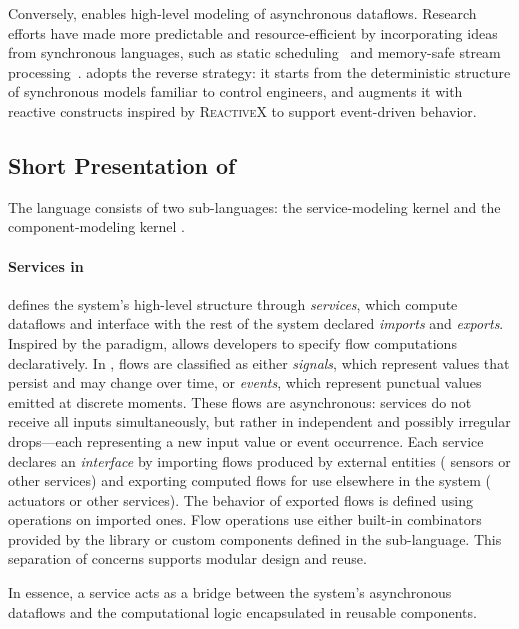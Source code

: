 Conversely, \frp enables high-level modeling of asynchronous dataflows. Research efforts have made
\frp more predictable and resource-efficient by incorporating ideas from synchronous languages,
such as static scheduling~\cite{DBLP:conf/haskell/NilssonCP02,DBLP:conf/ppdp/ChupinN19} and
memory-safe stream processing~\cite{DBLP:conf/icfp/Krishnaswami13}. \GRust adopts the reverse
strategy: it starts from the deterministic structure of synchronous models familiar to control
engineers, and augments it with reactive constructs inspired by \textsc{ReactiveX} to support
event-driven behavior.

\subsection{Short Presentation of \GRust}
\label{sec:intro:contrib:grust}

The \GRust language consists of two sub-languages: the service-modeling kernel \GRFRP and the
component-modeling kernel \GRSync.

\paragraph{Services in \GRFRP}
\label{sec:intro:contrib:grust:grfrp}

\GRFRP defines the system's high-level structure through \emph{services}, which compute dataflows
and interface with the rest of the system \via declared \emph{imports} and \emph{exports}. Inspired
by the \frp paradigm, \GRFRP allows developers to specify flow computations declaratively.
%
In \GRFRP, flows are classified as either \emph{signals}, which represent values that persist and may
change over time, or \emph{events}, which represent punctual values emitted at discrete moments.
These flows are asynchronous: services do not receive all inputs simultaneously, but rather in
independent and possibly irregular drops---each representing a new input value or event occurrence.
%
Each service declares an \emph{interface} by importing flows produced by external entities (\eg
sensors or other services) and exporting computed flows for use elsewhere in the system (\eg
actuators or other services). The behavior of exported flows is defined using operations on imported
ones.
%
Flow operations use either built-in combinators provided by the \GReact library or custom components
defined in the \GRSync sub-language. This separation of concerns supports modular design and reuse.

In essence, a \GRFRP service acts as a bridge between the system's asynchronous dataflows and the
computational logic encapsulated in reusable components.

